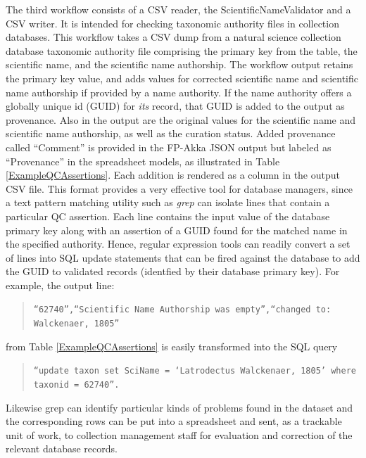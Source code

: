 \documentclass{article}
\begin{document}
The third workflow consists of a CSV reader, the ScientificNameValidator and a CSV writer. 
It is intended for checking taxonomic authority files in collection databases. 
This workflow takes a CSV dump from a natural science collection database taxonomic authority file comprising the primary key from the table, the scientific name, and the scientific name authorship. 
The workflow output retains the primary key value, and adds values for corrected scientific name and scientific name authorship if provided by a name authority. If the name authority offers a globally unique id (GUID) for \emph{its} record, that GUID is added to the output as provenance.
Also in the output are the original values for the scientific name and scientific name authorship, as well as the curation status. Added provenance called ``Comment'' is provided in the FP-Akka JSON output but labeled as ``Provenance'' in the spreadsheet models, as illustrated in Table \ref{ExampleQCAssertions}.  Each addition is rendered as a column in the output CSV file. 
This format provides a very effective tool for database managers, since a text pattern matching utility such as \emph{grep} \citep{wikiGrep}
can isolate lines that contain a particular QC assertion.  Each line contains the input value of the database primary key along with an assertion of a GUID found for the matched name in the specified authority. Hence, regular expression tools can readily convert a set of lines into SQL update statements that can be fired against the database to add the GUID to validated records (identfied by their database primary key).  For example, the output line: 
\begin{quotation}\noindent\texttt{``62740'',``Scientific Name Authorship was empty'',``changed to: Walckenaer, 1805''}\end{quotation}
from Table \ref{ExampleQCAssertions} is easily transformed into the SQL query 
\begin{quotation}\noindent\texttt{``update taxon set SciName = `Latrodectus Walckenaer, 1805' where taxonid = 62740''.}\end{quotation}
Likewise grep can identify particular kinds of problems found in the dataset and the corresponding rows can be put into a spreadsheet and sent, as a trackable unit of work, to collection management staff for evaluation and correction of the relevant database records.

\end{document}
